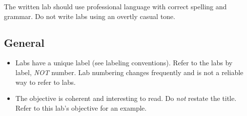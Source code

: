 The written lab should use professional language with correct spelling and grammar.
Do not write labs using an overtly casual tone.

\subsection{General}
\begin{itemize}
\item Labs have a unique label (see labeling conventions).
Refer to the labs by label, \emph{NOT} number.
Lab numbering changes frequently and is not a reliable way to refer to labs.
\item The objective is coherent and interesting to read.
Do \emph{not} restate the title.
Refer to this lab's objective for an example.
\end{itemize}

